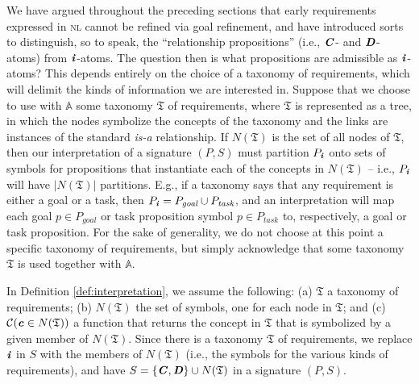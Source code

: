 \documentclass[10pt, conference, compsocconf]{IEEEtran}
\begin{document}
We have argued throughout the preceding sections that early requirements expressed in \textsc{nl} cannot be refined via goal refinement, and have introduced sorts to distinguish, so to speak, the ``relationship propositions'' (i.e., $\textbf{\textit{C}}$- and $\textbf{\textit{D}}$-atoms) from $\textbf{\textit{i}}$-atoms. The question then is what propositions are admissible as $\textbf{\textit{i}}$-atoms? This depends entirely on the choice of a taxonomy of requirements, which will delimit the kinds of information we are interested in. Suppose that we choose to use with $\mathbb{A}$ some taxonomy $\mathfrak{T}$ of requirements, where $\mathfrak{T}$ is represented as a tree, in which the nodes symbolize the concepts of the taxonomy and the links are instances of the standard \textit{is-a} relationship. If $N(\mathfrak{T})$ is the set of all nodes of $\mathfrak{T}$, then our interpretation of a signature $(P, S)$ must partition $P_{\textbf{\textit{i}}}$ onto sets of symbols for propositions that instantiate each of the concepts in $N(\mathfrak{T})$ -- i.e., $P_{\textbf{\textit{i}}}$ will have $|N(\mathfrak{T})|$ partitions. E.g., if a taxonomy says that any requirement is either a goal or a task, then $P_{\textbf{\textit{i}}} = P_{\textit{goal}} \cup P_{\textit{task}}$, and an interpretation will map each goal $p \in P_{\textit{goal}}$ or task proposition symbol $p \in P_{\textit{task}}$ to, respectively, a goal or task proposition. For the sake of generality, we do not choose at this point a specific taxonomy of requirements, but simply acknowledge that some taxonomy $\mathfrak{T}$ is used together with $\mathbb{A}$. 

\begin{remark}
In Definition \ref{def:interpretation}, we assume the following: (a) $\mathfrak{T}$ a taxonomy of requirements; (b) $N(\mathfrak{T})$ the set of symbols, one for each node in $\mathfrak{T}$; and (c) $\mathcal{C}(\textbf{\textit{c}} \in N(\mathfrak{T}))$ a function that returns the concept in $\mathfrak{T}$ that is symbolized by a given member of $N(\mathfrak{T})$. Since there is a taxonomy $\mathfrak{T}$ of requirements, we replace $\textbf{\textit{i}}$ in $S$ with the members of $N(\mathfrak{T})$ (i.e., the symbols for the various kinds of requirements), and have $S = \{ \textbf{\textit{C}}, \textbf{\textit{D}} \} \cup N(\mathfrak{T})$ in a signature $(P, S)$.
\end{remark}
\end{document}
